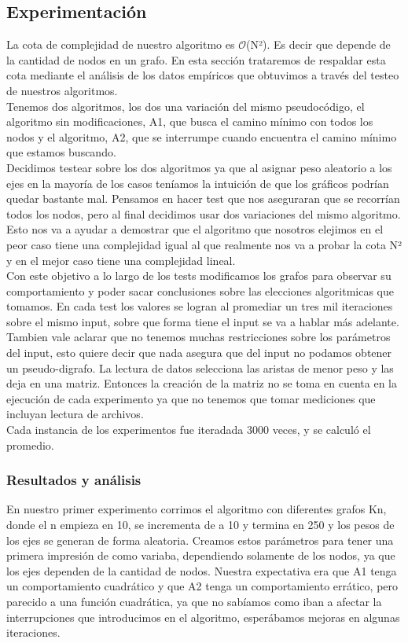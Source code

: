 \documentclass[spanish,12pt]{article}
\begin{document}
\subsection{Experimentación}

La cota de complejidad de nuestro algoritmo es $\mathcal{O}$(N²). Es decir que depende de la cantidad de nodos en un grafo.
En esta sección trataremos de respaldar esta cota mediante el análisis de los datos empíricos que obtuvimos a través del testeo de nuestros algoritmos.
\\
Tenemos dos algoritmos, los dos una variación del mismo pseudocódigo, el algoritmo sin modificaciones, A1, que busca el camino mínimo con todos los nodos y el algoritmo, A2, que se interrumpe cuando encuentra el camino mínimo que estamos buscando.  
\\
 Decidimos testear sobre los dos algoritmos ya que al asignar peso aleatorio a los ejes en la mayoría de los casos teníamos la intuición de que los gráficos podrían quedar bastante mal. Pensamos en hacer test que nos aseguraran que se recorrían todos los nodos, pero al final decidimos usar dos variaciones del mismo algoritmo. Esto nos va a ayudar a demostrar que el algoritmo que nosotros elejimos en el peor caso tiene una complejidad igual al que realmente nos va a probar la cota N² y en el mejor caso tiene una complejidad lineal.
\\  
Con este objetivo a lo largo de los tests modificamos los grafos para observar su comportamiento y poder sacar conclusiones sobre las elecciones algoritmicas que tomamos. En cada test los valores se logran al promediar un tres mil iteraciones sobre el mismo input, sobre que forma tiene el input se va a hablar más adelante.
\\
Tambien vale aclarar que no tenemos muchas restricciones sobre los parámetros del input, esto quiere decir que nada asegura que del input no podamos obtener un pseudo-digrafo. La lectura de datos selecciona las aristas de menor peso y las deja en una matriz. Entonces la creación de la matriz no se toma en cuenta en la ejecución de cada experimento ya que no tenemos que tomar mediciones que incluyan lectura de archivos.
\\Cada instancia de los experimentos fue iteradada 3000 veces, y se calculó el promedio.
\subsubsection{Resultados y análisis}

En nuestro primer experimento corrimos el algoritmo con diferentes grafos Kn, donde el n empieza en 10, se incrementa de a 10 y termina en 250 y los pesos de los ejes se generan de forma aleatoria. Creamos estos parámetros para tener una primera impresión de como variaba, dependiendo solamente de los nodos, ya que los ejes dependen de la cantidad de nodos. Nuestra expectativa era que A1 tenga un comportamiento cuadrático y que A2 tenga un comportamiento errático, pero parecido a una función cuadrática, ya que no sabíamos como iban a afectar la interrupciones que introducimos en el algoritmo, esperábamos mejoras en algunas iteraciones.
\end{document}
